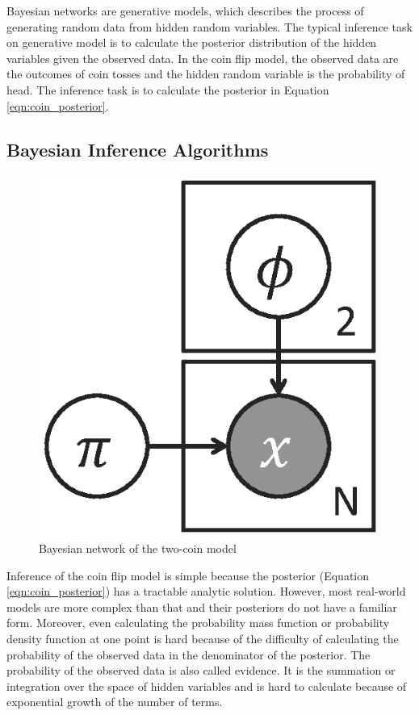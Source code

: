Bayesian networks are generative models, which describes the process of
generating random data from hidden random variables. The typical inference
task on generative model is to calculate the posterior distribution of the
hidden variables given the observed data. In the coin flip model, the
observed data are the outcomes of coin tosses and the hidden random variable
is the probability of head. The inference task is to calculate the posterior
in Equation \ref{eqn:coin_posterior}.

\subsection{Bayesian Inference Algorithms}


\begin{figure}
	\centering
	\includegraphics[scale=0.5,clip]{figs/two_coins.eps}
	\caption{Bayesian network of the two-coin model}
	\label{fig:two_coins}
\end{figure}

Inference of the coin flip model is simple because the posterior
(Equation \ref{eqn:coin_posterior})
 has a tractable analytic solution. 
However, most real-world models are more complex than that
and their posteriors do not have a familiar form. 
Moreover, even calculating the
probability mass function or probability density function at one point is hard
because of the difficulty of calculating the probability of the
observed data in the denominator of the posterior. The probability of the
observed data is also called evidence. It is the summation or integration over
the space of hidden variables and is hard to calculate because of exponential
growth of the number of terms. 

